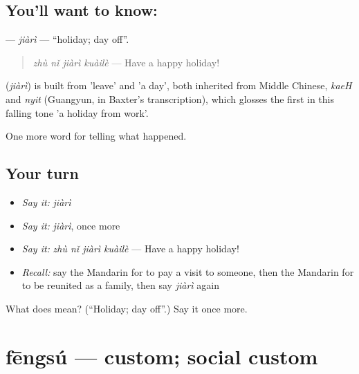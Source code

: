 \subsection*{You'll want to know: }
\textbf{} — \emph{jiàrì} — \textquotedblleft{}holiday; day off\textquotedblright{}.

\begin{quote}
\textbf{} \emph{zhù nǐ jiàrì kuàilè} — Have a happy holiday!
\end{quote}

\begin{cousinweb}
\textbf{} (\emph{jiàrì}) is built from  'leave' and  'a day', both inherited from Middle Chinese, \emph{kaeH} and \emph{nyit} (Guangyun, in Baxter's transcription), which glosses the first in this falling tone 'a holiday from work'.
\end{cousinweb}

\begin{grammarlens}[title={What you've built}]
One more word for telling what happened.
\end{grammarlens}

\subsection*{Your turn}
\begin{itemize}
\raggedright
  \item \emph{Say it:} \emph{jiàrì}
  \item \emph{Say it:} \emph{jiàrì}, once more
  \item \emph{Say it:} \emph{zhù nǐ jiàrì kuàilè} — Have a happy holiday!
  \item \emph{Recall:} say the Mandarin for to pay a visit to someone, then the Mandarin for to be reunited as a family, then say \emph{jiàrì} again
\end{itemize}

\begin{tcolorbox}[breakable,colback=teal!4,colframe=teal!35!black,title={Before you move on}]
What does  mean? (\textquotedblleft{}Holiday; day off\textquotedblright{}.) Say it once more.
\end{tcolorbox}
\section[fēngsú]{fēngsú — custom; social custom}

\label{lesson:ZH-C338-fengsu}



